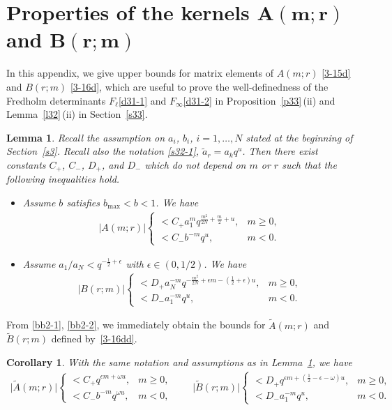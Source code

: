 \documentclass[11pt]{article}
\numberwithin{equation}{section}
\numberwithin{equation}{section}
\newtheorem{Corollary}[Theorem]{Corollary}
\newtheorem{Lemma}[Theorem]{Lemma}
\def\e{\epsilon}
\def\i{\infty}
\def\o{\omega}
\begin{document}
\section[Properties of the kernels A(m;r) and B(r;m)]{Properties of the kernels $\boldsymbol{A(m;r)}$ and $\boldsymbol{B(r;m)}$}
\label{ab}
 In this appendix, we give upper bounds for matrix elements of $A(m;r)$ \eqref{3-15d} and $B(r;m)$ \eqref{3-16d}, which are useful to prove the well-definedness of the Fredholm determinants $F_{\ell}$\eqref{d31-1} and $F_{\i}$\eqref{d31-2} in Proposition~\ref{p33}\,(ii) and Lemma~\ref{l32}\,(ii) in Section~\ref{s33}.
\begin{Lemma}
\label{lb1}
Recall the assumption on $a_i$, $b_i$, $i=1,\dots,N$ stated at the beginning of Section~{\rm\ref{s3}}. Recall also the notation \eqref{s32-1}, $\tilde{a}_r=a_k q^{u}$. Then there exist constants $C_+$, $C_-$, $D_+$, and $D_-$ which do not depend on $m$ or
$r$ such that the following inequalities hold.
\begin{itemize}\itemsep=0pt
 \item [$(i)$] Assume $b$ satisfies $b_{\max}<b<1$. We have
 \begin{align}
 \label{bb2-1}
 |A(m;r)|
 \begin{cases}
 < C_+ a_{1}^mq^{\frac{m^2}{2N}+\frac{m}{2}+u}, & m\ge 0,
 \\
 < C_- b^{-m} q^{u}, & m<0.
 \end{cases}
 \end{align}
 \item[$(ii)$] Assume $a_{1}/a_{N}<q^{-\frac12+\e}$ with $\e\in(0,1/2)$. We have
 \begin{align}
 \label{bb2-2}
 |B(r;m)|
 \begin{cases}
 < D_+ a_{N}^{-m}q^{-\frac{m^2}{2N}+\e m-(\frac12+\e)u}, & m\ge 0,
 \\
 < D_- a_{1}^{-m}q^{u}, & m<0.
 \end{cases}
 \end{align}
\end{itemize}
\end{Lemma}

From \eqref{bb2-1}, \eqref{bb2-2}, we immediately obtain the bounds
for $\tilde{A}(m;r)$ and $\tilde{B}(r;m)$ defined by~\eqref{3-16dd}.

\begin{Corollary}\label{cb2}
With the same notation and assumptions as in Lemma~{\rm\ref{lb1}},
we have
\begin{align*}%
 \big|\tilde{A}(m;r)\big|
 \begin{cases}
 < C_+ q^{\e m+\o u}, & m\ge 0,
 \\
 < C_- b^{-m} q^{\omega u}, & m<0,
 \end{cases}
 \qquad
 \big|\tilde{B}(r;m)\big|
 \begin{cases}
 < D_+ q^{\e m+(\frac12-\e-\o)u}, & m\ge 0,
 \\
 < D_- a_1^{-m}q^{u}, & m<0.
 \end{cases}
 \end{align*}
 \end{Corollary}
\end{document}
